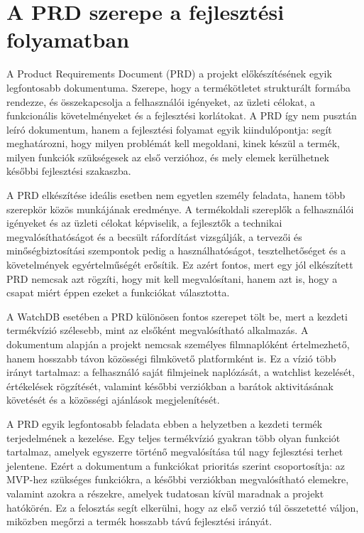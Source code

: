 \section{A PRD szerepe a fejlesztési folyamatban}

A Product Requirements Document (PRD) a projekt előkészítésének egyik legfontosabb dokumentuma. Szerepe, hogy a termékötletet strukturált formába rendezze, és összekapcsolja a felhasználói igényeket, az üzleti célokat, a funkcionális követelményeket és a fejlesztési korlátokat. A PRD így nem pusztán leíró dokumentum, hanem a fejlesztési folyamat egyik kiindulópontja: segít meghatározni, hogy milyen problémát kell megoldani, kinek készül a termék, milyen funkciók szükségesek az első verzióhoz, és mely elemek kerülhetnek későbbi fejlesztési szakaszba.

A PRD elkészítése ideális esetben nem egyetlen személy feladata, hanem több szerepkör közös munkájának eredménye. A termékoldali szereplők a felhasználói igényeket és az üzleti célokat képviselik, a fejlesztők a technikai megvalósíthatóságot és a becsült ráfordítást vizsgálják, a tervezői és minőségbiztosítási szempontok pedig a használhatóságot, tesztelhetőséget és a követelmények egyértelműségét erősítik. Ez azért fontos, mert egy jól elkészített PRD nemcsak azt rögzíti, hogy mit kell megvalósítani, hanem azt is, hogy a csapat miért éppen ezeket a funkciókat választotta.

A WatchDB esetében a PRD különösen fontos szerepet tölt be, mert a kezdeti termékvízió szélesebb, mint az elsőként megvalósítható alkalmazás. A dokumentum alapján a projekt nemcsak személyes filmnaplóként értelmezhető, hanem hosszabb távon közösségi filmkövető platformként is. Ez a vízió több irányt tartalmaz: a felhasználó saját filmjeinek naplózását, a watchlist kezelését, értékelések rögzítését, valamint későbbi verziókban a barátok aktivitásának követését és a közösségi ajánlások megjelenítését.

A PRD egyik legfontosabb feladata ebben a helyzetben a kezdeti termék terjedelmének a kezelése. Egy teljes termékvízió gyakran több olyan funkciót tartalmaz, amelyek egyszerre történő megvalósítása túl nagy fejlesztési terhet jelentene. Ezért a dokumentum a funkciókat prioritás szerint csoportosítja: az MVP-hez szükséges funkciókra, a későbbi verziókban megvalósítható elemekre, valamint azokra a részekre, amelyek tudatosan kívül maradnak a projekt hatókörén. Ez a felosztás segít elkerülni, hogy az első verzió túl összetetté váljon, miközben megőrzi a termék hosszabb távú fejlesztési irányát.

